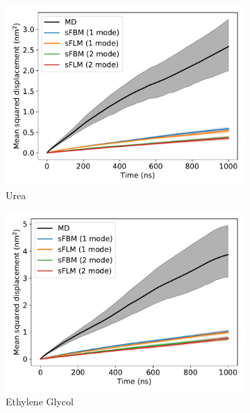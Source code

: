 \documentclass{article}
\begin{document}
  \begin{figure}[h]
  \centering
  \begin{subfigure}{0.45\textwidth}
  \includegraphics[width=\textwidth]{bothmode_msd_comparison_URE.pdf}
  \caption{Urea}\label{fig:bothmode_msd_comparison_URE}
  \end{subfigure}
  \begin{subfigure}{0.45\textwidth}
  \includegraphics[width=\textwidth]{bothmode_msd_comparison_GCL.pdf}
  \caption{Ethylene Glycol}\label{bothmode_msd_comparison_GCL}
  \end{subfigure}
  \begin{subfigure}{0.45\textwidth}

\end{subfigure}
\end{figure}
\end{document}

